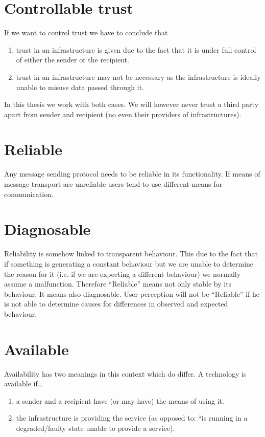 \section{Controllable trust}
If we want to control trust we have to conclude that
\begin{enumerate}
	\item trust in an infrastructure is given due to the fact that it is under full control of either the sender or the recipient.
	\item trust in an infrastructure may not be necessary as the infrastructure is ideally unable to misuse data passed through it.
\end{enumerate}
In this thesis we work with both cases. We will however never trust a third party apart from sender and recipient (no even their providers of infrastructures).

\section{Reliable}
Any message sending protocol needs to be reliable in its functionality. If means of message transport are unreliable users tend to use different means for communication. 

\section{Diagnosable}
Reliability is somehow linked to transparent behaviour. This due to the fact that if something is generating a constant behaviour but we are unable to determine the reason for it (i.e. if we are expecting a different behaviour) we normally assume a malfunction. Therefore ``Reliable'' means not only stable by its behaviour. It means also diagnosable. User perception will not be ``Reliable'' if he is not able to determine causes for differences in observed and expected behaviour.

\section{Available}
Availability has two meanings in this context which do differ. A technology is available if\ldots
\begin{enumerate}
	\item a sender and a recipient have (or may have) the means of using it.
	\item the infrastructure is providing the service (as opposed to: ``is running in a degraded/faulty state unable to provide a service).
\end{enumerate}

